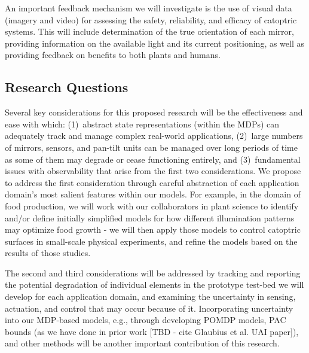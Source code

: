 An important feedback mechanism we will investigate is the use of visual
data (imagery and video) for assessing the safety, reliability, and
efficacy of catoptric systems. This will include determination of the true
orientation of each mirror, providing information on the available
light and its current positioning, as well as providing feedback on
benefits to both plants and humans.

\subsection{Research Questions}
\label{sec:rq}


Several key considerations for this proposed research will be the effectiveness
and ease with which: (1)~abstract state representations (within the MDPs) can
adequately track and manage complex real-world applications, (2)~large numbers
of mirrors, sensors, and pan-tilt units can be managed over long periods of
time as some of them may degrade or cease functioning entirely, and
(3)~fundamental issues with observability that arise from the first two
considerations.  We propose to address the first consideration through careful
abstraction of each application domain's most salient features within our
models.  For example, in the domain of food production, we will work with our
collaborators in plant science to identify and/or define initially simplified
models for how different illumination patterns may optimize food growth - we
will then apply those models to control catoptric surfaces in small-scale
physical experiments, and refine the models based on the results of those
studies.

The second and third considerations will be addressed by tracking and reporting
the potential degradation of individual elements in the prototype test-bed we
will develop for each application domain, and examining the uncertainty in
sensing, actuation, and control that may occur because of it.  Incorporating
uncertainty into our MDP-based models, e.g., through developing POMDP models,
PAC bounds (as we have done in prior work [TBD - cite Glaubius et al. UAI
paper]), and other methods will be another important contribution of this
research.

